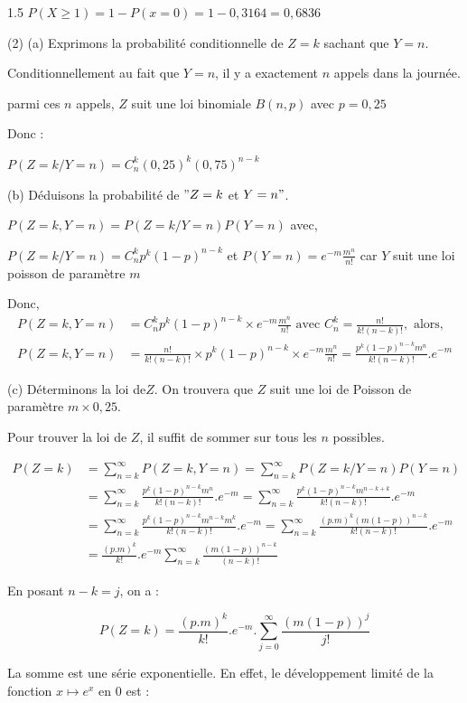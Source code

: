 \documentclass[12pt]{article}
\begin{document}
\begin{spacing}{1.5}
$P(X\geq 1)=1-P(x=0)=1-0,3164=0,6836$

(2) (a) Exprimons la probabilité conditionnelle de $Z = k$ sachant que $Y = n$.

Conditionnellement au fait que $Y=n$, il y a exactement $n$ appels dans la journée.

parmi ces $n$ appels, $Z$ suit une loi binomiale $B(n,p)$ avec $p=0,25$

Donc :

$P(Z=k/Y=n)=C_n^k(0,25)^k(0,75)^{n-k}$

 
 \medskip
 (b) Déduisons la probabilité de $"Z = k$ et $Y = n"$.
 
$P(Z=k,Y=n)=P(Z=k/Y=n)P(Y=n)$ avec,

 $P(Z=k/Y=n)=C_n^kp^k(1-p)^{n-k}$ et $P(Y=n)=e^{-m}\frac{m^n}{n!}$ car $Y$ suit une loi poisson de paramètre $m$

Donc,
\begin{align*}
P(Z=k,Y=n)&=C_n^kp^k(1-p)^{n-k}\times e^{-m}\frac{m^n}{n!} \text{ avec }   C_n^k=\frac{n!}{k!(n-k)!}, \text{ alors, } \\
P(Z=k,Y=n)&=\frac{n!}{k!(n-k)!}\times p^k(1-p)^{n-k}\times e^{-m}\frac{m^n}{n!}=\frac{p^k(1-p)^{n-k}m^n}{k!(n-k)!}.e^{-m}
\end{align*}
 
 
(c) Déterminons la loi de$ Z$. On trouvera que $Z$ suit une loi de Poisson de paramètre
 $m\times 0,25$.
 
 Pour trouver la loi de $Z$, il suffit de sommer sur tous les $n$ possibles.
 
\begin{align*}
P(Z=k)&=\sum_{n=k}^{\infty}P(Z=k,Y=n)=\sum_{n=k}^{\infty}P(Z=k/Y=n)P(Y=n)\\
&=\sum_{n=k}^{\infty}\frac{p^k(1-p)^{n-k}m^n}{k!(n-k)!}.e^{-m}=\sum_{n=k}^{\infty}\frac{p^k(1-p)^{n-k}m^{n-k+k}}{k!(n-k)!}.e^{-m}\\
&=\sum_{n=k}^{\infty}\frac{p^k(1-p)^{n-k}m^{n-k}m^k}{k!(n-k)!}.e^{-m}=\sum_{n=k}^{\infty}\frac{(p.m)^k(m(1-p))^{n-k}}{k!(n-k)!}.e^{-m}\\
&=\frac{(p.m)^k}{k!}.e^{-m}\sum_{n=k}^{\infty}\frac{(m(1-p))^{n-k}}{(n-k)!}
\end{align*}

En posant $n-k=j$, on a :

\[P(Z=k)=\frac{(p.m)^k}{k!}.e^{-m}.\sum_{j=0}^{\infty}\frac{(m(1-p))^j}{j!}\]

La somme est une série exponentielle. En effet, le développement limité de la fonction $x\longmapsto e^x$ en 0 est :


\end{spacing}
\end{document}
